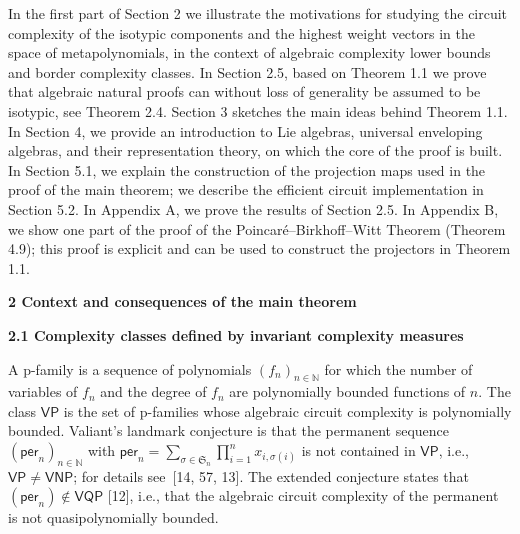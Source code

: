\documentclass[10pt,a4paper]{article}
\begin{document}
In the first part of Section 2 we illustrate the motivations for studying the circuit complexity of the isotypic components and the highest weight vectors in the space of metapolynomials, in the context of algebraic complexity lower bounds and border complexity classes.
In Section 2.5, based on Theorem 1.1 we prove that algebraic natural proofs can without loss of generality be assumed to be isotypic, see Theorem 2.4.
Section 3 sketches the main ideas behind Theorem 1.1. In Section 4, we provide an introduction to Lie algebras, universal enveloping algebras, and their representation theory, on which the core of the proof is built. In Section 5.1, we explain the construction of the projection maps used in the proof of the main theorem; we describe the efficient circuit implementation in Section 5.2. In Appendix A, we prove the results of Section 2.5. In Appendix B, we show one part of the proof of the Poincaré–Birkhoff–Witt Theorem (Theorem 4.9); this proof is explicit and can be used to construct the projectors in Theorem 1.1.







\par\medskip\noindent\textbf{2 Context and consequences of the main theorem}\par




\par\medskip\noindent\textbf{2.1 Complexity classes defined by invariant complexity measures}\par




A p-family is a sequence of polynomials $(f_{n})_{n\in\mathbb{N}}$ for which the number of variables of $f_{n}$ and the degree of $f_{n}$ are polynomially bounded functions of $n$. The class $\mathsf{VP}$ is the set of p-families whose algebraic circuit complexity is polynomially bounded.
Valiant’s landmark conjecture is that the permanent sequence $(\mathsf{per}_{n})_{n\in\mathbb{N}}$ with $\mathsf{per}_{n}=\sum_{\sigma\in\mathfrak{S}_{n}}\prod_{i=1}^{n}x_{i,\sigma(i)}$ is not contained in $\mathsf{VP}$, i.e., $\mathsf{VP}\neq\mathsf{VNP}$; for details see [14, 57, 13]. The extended conjecture states that $(\mathsf{per}_{n})\notin\mathsf{VQP}$ [12], i.e., that the algebraic circuit complexity of the permanent is not quasipolynomially bounded.
\end{document}
